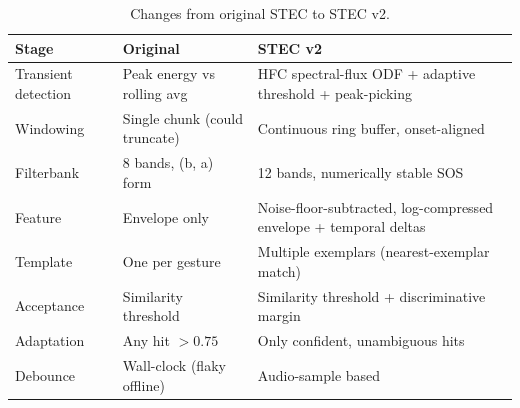 \documentclass[12pt,a4paper]{article}
\begin{document}
\begin{table}[h]
\centering
\small
\caption{Changes from original STEC to STEC v2.}
\label{tab:upgrades}
\begin{tabular}{@{}p{2.2cm}p{3.8cm}p{5.5cm}@{}}
\toprule
Stage & Original & STEC v2 \\
\midrule
Transient detection & Peak energy vs rolling avg & HFC spectral-flux ODF + adaptive threshold + peak-picking \\
Windowing & Single chunk (could truncate) & Continuous ring buffer, onset-aligned \\
Filterbank & 8 bands, (b, a) form & 12 bands, numerically stable SOS \\
Feature & Envelope only & Noise-floor-subtracted, log-compressed envelope + temporal deltas \\
Template & One per gesture & Multiple exemplars (nearest-exemplar match) \\
Acceptance & Similarity threshold & Similarity threshold + discriminative margin \\
Adaptation & Any hit $>0.75$ & Only confident, unambiguous hits \\
Debounce & Wall-clock (flaky offline) & Audio-sample based \\
\bottomrule
\end{tabular}
\end{table}

\clearpage
\end{document}
